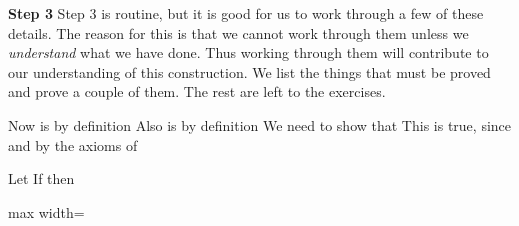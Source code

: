 \documentclass[11pt,oneside]{article}
\begin{document}
\begin{BookBody}

\textbf{Step 3} Step 3 is routine, but it is good for us to work through a few of these details. The reason for this is that we cannot work through them unless we\textit{ understand} what we have done. Thus working through them will contribute to our understanding of this construction. We list the things that must be proved and prove a couple of them. The rest are left to the exercises.


 Now \BookInline{[(a,\allowbreak b)]+ [(c,\allowbreak d)]} is by definition  Also \BookInline{[(c,\allowbreak d)]+ [(a,\allowbreak b)]} is by definition  We need to show that  This is true, since  and  by the axioms of \BookEnd{\blacklozenge}









 Let  If  then

\begin{center}\begin{adjustbox}{max width=\linewidth}\end{adjustbox}\end{center}


\end{BookBody}
\end{document}
